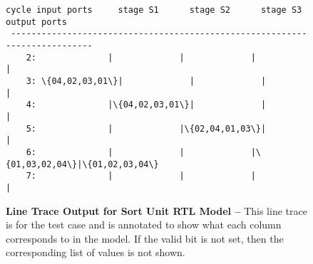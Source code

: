 
\begin{figure}

  \footnotesize
  \begin{Verbatim}[xleftmargin=0.77in,commandchars=\\\{\}]
 cycle input ports     stage S1      stage S2      stage S3    output ports
 ---------------------------------------------------------------------------
    2:              |             |             |             |
    3: \{04,02,03,01\}|             |             |             |
    4:              |\{04,02,03,01\}|             |             |
    5:              |             |\{02,04,01,03\}|             |
    6:              |             |             |\{01,03,02,04\}|\{01,02,03,04\}
    7:              |             |             |             |
  \end{Verbatim}

  \caption{\textbf{Line Trace Output for Sort Unit RTL Model --} This
    line trace is for the  test case and is annotated to
    show what each column corresponds to in the model. If the valid bit
    is not set, then the corresponding list of values is not shown.}
  \label{fig-tut3-sort-rtl-linetrace}

\end{figure}

